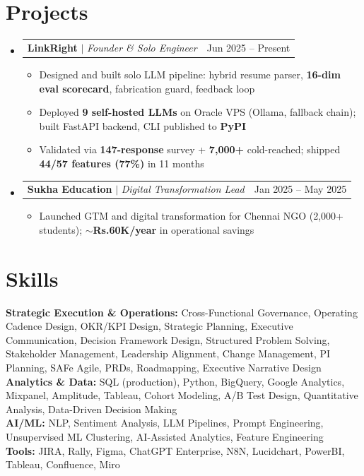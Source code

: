 \documentclass[a4paper,10pt]{article}
\makeatletter
\newcommand{\resumeItem}[1]{
  \item\small{#1\vspace{-2pt}}
}
\newcommand{\resumeProjectHeading}[2]{
  \item
  \begin{tabular*}{0.97\textwidth}{l@{\extracolsep{\fill}}r}
    \small#1 & #2 \\
  \end{tabular*}\vspace{-7pt}
}
\newcommand{\resumeSubHeadingListStart}{\begin{itemize}[leftmargin=0.15in, label={}]}
\newcommand{\resumeSubHeadingListEnd}{\end{itemize}}
\newcommand{\resumeItemListStart}{\begin{itemize}\parfillskip=0pt}
\newcommand{\resumeItemListEnd}{\end{itemize}\vspace{-5pt}}
\makeatother
\begin{document}
\section{Projects}
\resumeSubHeadingListStart

  \resumeProjectHeading
    {\textbf{LinkRight} $|$ \emph{Founder \& Solo Engineer}}{Jun 2025 -- Present}
  \resumeItemListStart
    \resumeItem{Designed and built solo LLM pipeline: hybrid resume parser, \textbf{16-dim eval scorecard}, fabrication guard, feedback loop}
    \resumeItem{Deployed \textbf{9 self-hosted LLMs} on Oracle VPS (Ollama, fallback chain); built FastAPI backend, CLI published to \textbf{PyPI}}
    \resumeItem{Validated via \textbf{147-response} survey + \textbf{7,000+} cold-reached; shipped \textbf{44/57 features (77\%)} in 11 months}
  \resumeItemListEnd

  \resumeProjectHeading
    {\textbf{Sukha Education} $|$ \emph{Digital Transformation Lead}}{Jan 2025 -- May 2025}
  \resumeItemListStart
    \resumeItem{Launched GTM and digital transformation for Chennai NGO (2,000+ students); \textbf{$\sim$Rs.60K/year} in operational savings}
  \resumeItemListEnd

\resumeSubHeadingListEnd

\section{Skills}
\begin{itemize}[leftmargin=0.15in, label={}]
  \small{\item{
    \textbf{Strategic Execution \& Operations:}{ Cross-Functional Governance, Operating Cadence Design, OKR/KPI Design, Strategic Planning, Executive Communication, Decision Framework Design, Structured Problem Solving, Stakeholder Management, Leadership Alignment, Change Management, PI Planning, SAFe Agile, PRDs, Roadmapping, Executive Narrative Design} \\
    \textbf{Analytics \& Data:}{ SQL (production), Python, BigQuery, Google Analytics, Mixpanel, Amplitude, Tableau, Cohort Modeling, A/B Test Design, Quantitative Analysis, Data-Driven Decision Making} \\
    \textbf{AI/ML:}{ NLP, Sentiment Analysis, LLM Pipelines, Prompt Engineering, Unsupervised ML Clustering, AI-Assisted Analytics, Feature Engineering} \\
    \textbf{Tools:}{ JIRA, Rally, Figma, ChatGPT Enterprise, N8N, Lucidchart, PowerBI, Tableau, Confluence, Miro}
  }}
\end{itemize}
\end{document}
